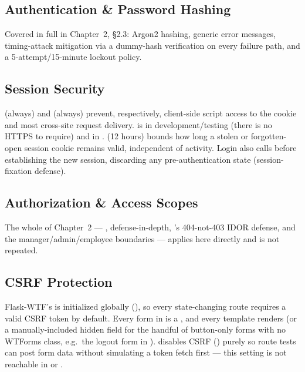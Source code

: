 \subsection*{Authentication \& Password Hashing}

Covered in full in Chapter~2, \S2.3: Argon2 hashing, generic error
messages, timing-attack mitigation via a dummy-hash verification on
every failure path, and a 5-attempt/15-minute lockout policy.

\subsection*{Session Security}

 (always) and
 (always) prevent, respectively,
client-side script access to the cookie and most cross-site request
delivery.  is  in
development/testing (there is no HTTPS to require) and  in
.  (12 hours)
bounds how long a stolen or forgotten-open session cookie remains
valid, independent of activity. Login also calls
 before establishing the new session, discarding
any pre-authentication state (session-fixation defense).

\subsection*{Authorization \& Access Scopes}

The whole of Chapter~2 --- , defense-in-depth,
's 404-not-403 IDOR defense, and the
manager/admin/employee boundaries --- applies here directly and is not
repeated.

\subsection*{CSRF Protection}

Flask-WTF's  is initialized globally
(), so every state-changing  route
requires a valid CSRF token by default. Every form in
 is a , and every template renders
 (or a manually-included
 hidden field for the handful of button-only forms
with no WTForms class, e.g.\ the logout form in ).
 disables CSRF ()
purely so route tests can post form data without simulating a token
fetch first --- this setting is not reachable in  or
.

